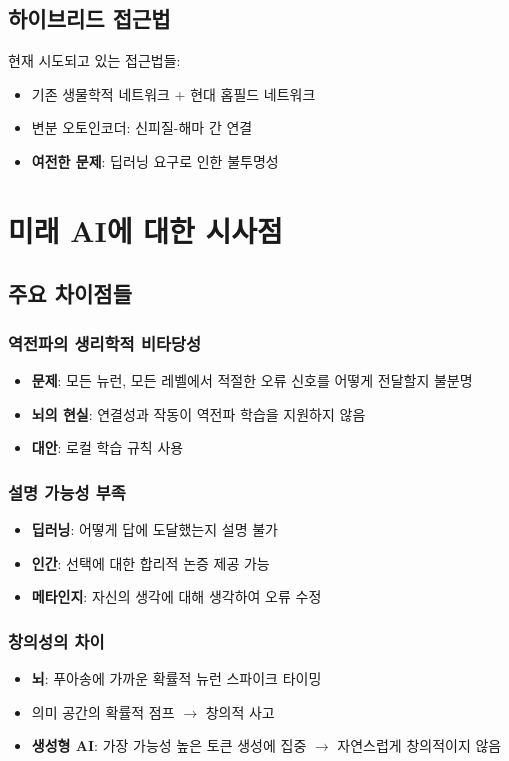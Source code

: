 \documentclass[openany]{book}
\begin{document}
\begin{appendices}
\subsection{하이브리드 접근법}
현재 시도되고 있는 접근법들:

\begin{itemize}
\item 기존 생물학적 네트워크 + 현대 홉필드 네트워크
\item 변분 오토인코더: 신피질-해마 간 연결
\item \textbf{여전한 문제}: 딥러닝 요구로 인한 불투명성
\end{itemize}

\section{미래 AI에 대한 시사점}

\subsection{주요 차이점들}

\subsubsection{역전파의 생리학적 비타당성}
\begin{itemize}
\item \textbf{문제}: 모든 뉴런, 모든 레벨에서 적절한 오류 신호를 어떻게 전달할지 불분명
\item \textbf{뇌의 현실}: 연결성과 작동이 역전파 학습을 지원하지 않음
\item \textbf{대안}: 로컬 학습 규칙 사용
\end{itemize}

\subsubsection{설명 가능성 부족}
\begin{itemize}
\item \textbf{딥러닝}: 어떻게 답에 도달했는지 설명 불가
\item \textbf{인간}: 선택에 대한 합리적 논증 제공 가능
\item \textbf{메타인지}: 자신의 생각에 대해 생각하여 오류 수정
\end{itemize}

\subsubsection{창의성의 차이}
\begin{itemize}
\item \textbf{뇌}: 푸아송에 가까운 확률적 뉴런 스파이크 타이밍
\item 의미 공간의 확률적 점프 $\rightarrow$ 창의적 사고
\item \textbf{생성형 AI}: 가장 가능성 높은 토큰 생성에 집중 $\rightarrow$ 자연스럽게 창의적이지 않음
\end{itemize}


\end{appendices}
\end{document}
